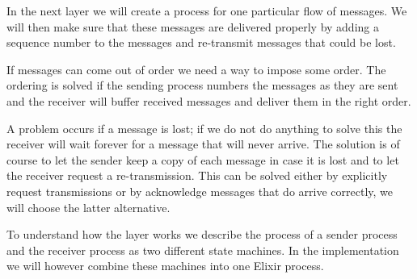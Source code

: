 \documentclass[a4paper,11pt]{article}
\begin{document}
In the next layer we will create a process for one particular flow of
messages. We will then make sure that these messages are delivered
properly by adding a sequence number to the messages and re-transmit
messages that could be lost.

If messages can come out of order we need a way to
impose some order. The ordering is solved if the sending process
numbers the messages as they are sent and the receiver will buffer
received messages and deliver them in the right order. 

A problem occurs if a message is lost; if we do not do anything to
solve this the receiver will wait forever for a message that will
never arrive. The solution is of course to let the sender keep a copy
of each message in case it is lost and to let the receiver request a
re-transmission. This can be solved either by explicitly request
transmissions or by acknowledge messages that do arrive correctly, we
will choose the latter alternative.

To understand how the layer works we describe the process of a sender
process and the receiver process as two different state machines. In
the implementation we will however combine these machines into one
Elixir process.
\end{document}
